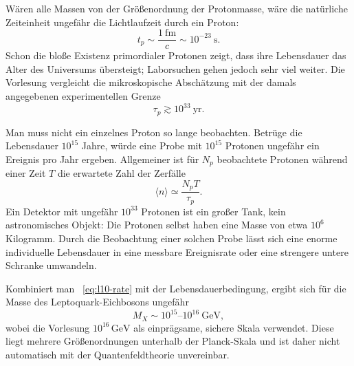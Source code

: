 \begin{classroomqa}
\end{classroomqa}

Wären alle Massen von der Größenordnung der Protonmasse, wäre die natürliche Zeiteinheit ungefähr die Lichtlaufzeit durch ein Proton:
\begin{equation}
t_p\sim\frac{1\ \mathrm{fm}}{c}\sim10^{-23}\ \mathrm{s}.
\label{eq:l10-proton-time}
\end{equation}
Schon die bloße Existenz primordialer Protonen zeigt, dass ihre Lebensdauer das Alter des Universums übersteigt; Laborsuchen gehen jedoch sehr viel weiter. Die Vorlesung vergleicht die mikroskopische Abschätzung mit der damals angegebenen experimentellen Grenze
\begin{equation}
\tau_p\gtrsim10^{33}\ \mathrm{yr}.
\label{eq:l10-lifetime-bound}
\end{equation}

Man muss nicht ein einzelnes Proton so lange beobachten. Betrüge die Lebensdauer \(10^{15}\) Jahre, würde eine Probe mit \(10^{15}\) Protonen ungefähr ein Ereignis pro Jahr ergeben. Allgemeiner ist für \(N_p\) beobachtete Protonen während einer Zeit \(T\) die erwartete Zahl der Zerfälle
\begin{equation}
\langle n\rangle\simeq\frac{N_pT}{\tau_p}.
\label{eq:l10-event-count}
\end{equation}
Ein Detektor mit ungefähr \(10^{33}\) Protonen ist ein großer Tank, kein astronomisches Objekt: Die Protonen selbst haben eine Masse von etwa \(10^6\) Kilogramm. Durch die Beobachtung einer solchen Probe lässt sich eine enorme individuelle Lebensdauer in eine messbare Ereignisrate oder eine strengere untere Schranke umwandeln.

Kombiniert man ~\eqref{eq:l10-rate} mit der Lebensdauerbedingung, ergibt sich für die Masse des Leptoquark-Eichbosons ungefähr
\begin{equation}
M_X\sim10^{15}\text{--}10^{16}\ \mathrm{GeV},
\label{eq:l10-mx}
\end{equation}
wobei die Vorlesung \(10^{16}\,\mathrm{GeV}\) als einprägsame, sichere Skala verwendet. Diese liegt mehrere Größenordnungen unterhalb der Planck-Skala und ist daher nicht automatisch mit der Quantenfeldtheorie unvereinbar.

